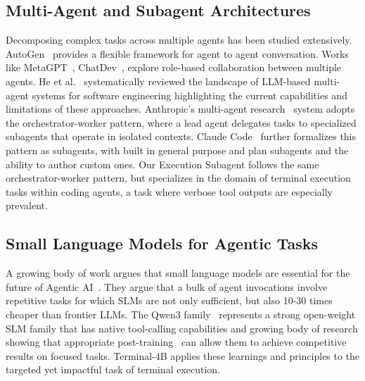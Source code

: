\documentclass[sigconf,review]{acmart}
\begin{document}
\subsection{Multi-Agent and Subagent Architectures}
Decomposing complex tasks across multiple agents has been studied extensively. AutoGen~\cite{autogen} provides a flexible framework for agent to agent conversation. Works like MetaGPT~\cite{metagpt}, ChatDev~\cite{chatdev}, explore role-based collaboration between multiple agents. He et al.~\cite{hesurvey} systematically reviewed the landscape of LLM-based multi-agent systems for software engineering highlighting the current capabilities and limitations of these approaches. Anthropic's multi-agent research~\cite{anthropicmultiagent} system adopts the orchestrator-worker pattern, where a lead agent delegates tasks to specialized subagents that operate in isolated contexts. Claude Code~\cite{claude_code_2024} further formalizes this pattern as subagents, with built in general purpose and plan subagents and the ability to author custom ones. Our Execution Subagent follows the same orchestrator-worker pattern, but specializes in the domain of terminal execution tasks within coding agents, a task where verbose tool outputs are especially prevalent.

\subsection{Small Language Models for Agentic Tasks}
A growing body of work argues that small language models are essential for the future of Agentic AI~\cite{slmfuture}. They argue that a bulk of agent invocations involve repetitive tasks for which SLMs are not only sufficient, but also 10-30 times cheaper than frontier LLMs. The Qwen3 family~\cite{qwen} represents a strong open-weight SLM family that has native tool-calling capabilities and growing body of research showing that appropriate post-training~\cite{deepseekr1, dangreason} can allow them to achieve competitive results on focused tasks. Terminal-4B applies these learnings and principles to the targeted yet impactful task of terminal execution.
\end{document}

